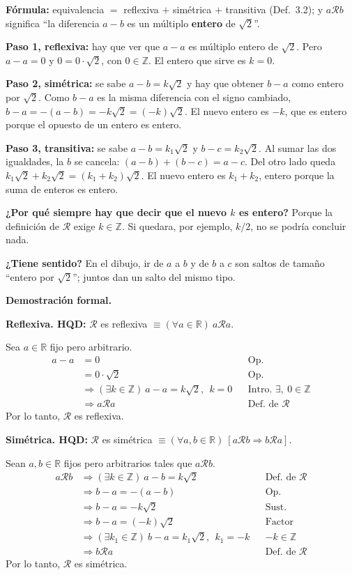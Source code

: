 \documentclass[11pt]{article}
\begin{document}
\begin{explica}
\textbf{Fórmula:} equivalencia $=$ reflexiva $+$ simétrica $+$ transitiva (Def.~3.2); y $a\mathcal Rb$ significa ``la diferencia $a-b$ es un múltiplo \textbf{entero} de $\sqrt2$''.

\textbf{Paso 1, reflexiva:} hay que ver que $a-a$ es múltiplo entero de $\sqrt2$. Pero $a-a=0$ y $0=0\cdot\sqrt2$, con $0\in\mathbb Z$. El entero que sirve es $k=0$.

\textbf{Paso 2, simétrica:} se sabe $a-b=k\sqrt2$ y hay que obtener $b-a$ como entero por $\sqrt2$. Como $b-a$ es la misma diferencia con el signo cambiado, $b-a=-(a-b)=-k\sqrt2=(-k)\sqrt2$. El nuevo entero es $-k$, que es entero porque el opuesto de un entero es entero.

\textbf{Paso 3, transitiva:} se sabe $a-b=k_1\sqrt2$ y $b-c=k_2\sqrt2$. Al sumar las dos igualdades, la $b$ se cancela: $(a-b)+(b-c)=a-c$. Del otro lado queda $k_1\sqrt2+k_2\sqrt2=(k_1+k_2)\sqrt2$. El nuevo entero es $k_1+k_2$, entero porque la suma de enteros es entero.

\textbf{¿Por qué siempre hay que decir que el nuevo $k$ es entero?} Porque la definición de $\mathcal R$ exige $k\in\mathbb Z$. Si quedara, por ejemplo, $k/2$, no se podría concluir nada.

\textbf{¿Tiene sentido?} En el dibujo, ir de $a$ a $b$ y de $b$ a $c$ son saltos de tamaño ``entero por $\sqrt2$''; juntos dan un salto del mismo tipo.
\end{explica}

\textbf{Demostración formal.}

\textbf{Reflexiva. HQD:} $\mathcal R$ es reflexiva $\equiv(\forall a\in\mathbb R)\ a\mathcal Ra$.

Sea $a\in\mathbb R$ fijo pero arbitrario.
\begin{align*}
a-a&=0 && \text{Op.}\\
&=0\cdot\sqrt2 && \text{Op.}\\
&\Rightarrow(\exists k\in\mathbb Z)\ a-a=k\sqrt2,\ \ k=0 && \text{Intro. }\exists,\ 0\in\mathbb Z\\
&\Rightarrow a\mathcal Ra && \text{Def. de }\mathcal R
\end{align*}
Por lo tanto, $\mathcal R$ es reflexiva.

\textbf{Simétrica. HQD:} $\mathcal R$ es simétrica $\equiv(\forall a,b\in\mathbb R)\ [a\mathcal Rb\Rightarrow b\mathcal Ra]$.

Sean $a,b\in\mathbb R$ fijos pero arbitrarios tales que $a\mathcal Rb$.
\begin{align*}
a\mathcal Rb&\Rightarrow(\exists k\in\mathbb Z)\ a-b=k\sqrt2 && \text{Def. de }\mathcal R\\
&\Rightarrow b-a=-(a-b) && \text{Op.}\\
&\Rightarrow b-a=-k\sqrt2 && \text{Sust.}\\
&\Rightarrow b-a=(-k)\sqrt2 && \text{Factor}\\
&\Rightarrow(\exists k_1\in\mathbb Z)\ b-a=k_1\sqrt2,\ \ k_1=-k && -k\in\mathbb Z\\
&\Rightarrow b\mathcal Ra && \text{Def. de }\mathcal R
\end{align*}
Por lo tanto, $\mathcal R$ es simétrica.
\end{document}
